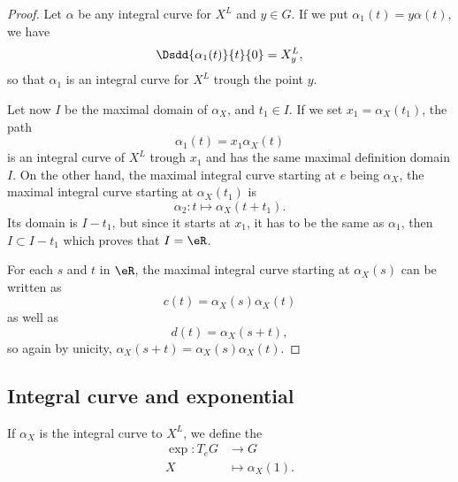 \begin{proof}
    Let \( \alpha\) be any integral curve for \( X^L\) and \( y\in G\). If we put \( \alpha_1(t)=y\alpha(t)\), we have
    \begin{equation}
        \Dsdd{ \alpha_1(t) }{t}{0}=X^L_y,
    \end{equation}
    so that \( \alpha_1\) is an integral curve for \( X^L\) trough the point \( y\). 

    Let now \( I\) be the maximal domain of \( \alpha_X\), and \( t_1\in I\). If we set \( x_1=\alpha_X(t_1)\), the path
    \begin{equation}
         \alpha_1(t)=x_1\alpha_X(t)
    \end{equation}
    is an integral curve of \( X^L\) trough \( x_1\) and has the same maximal definition domain \( I\). On the other hand, the maximal integral curve starting at \( e\) being \( \alpha_X\), the maximal integral curve starting at \( \alpha_X(t_1)\) is
    \begin{equation}
        \alpha_2\colon t\mapsto \alpha_X(t+t_1).
    \end{equation}
    Its domain is \( I-t_1\), but since it starts at \( x_1\), it has to be the same as \( \alpha_1\), then \( I\subset I-t_1\) which proves that \( I=\eR\).

    For each \( s\) and \( t\) in \( \eR\), the maximal integral curve starting at \( \alpha_X(s)\) can be written as
    \begin{equation}
        c(t)=\alpha_X(s)\alpha_X(t)
    \end{equation}
    as well as
    \begin{equation}
        d(t)=\alpha_X(s+t),
    \end{equation}
    so again by unicity, \( \alpha_X(s+t)=\alpha_X(s)\alpha_X(t)\).
\end{proof}


\subsection{Integral curve and exponential}

\begin{definition}
    If \( \alpha_X\) is the integral curve to \( X^L\), we define the 
    \begin{equation}        \label{EqdefExpoLieTgFGp}
        \begin{aligned}
            \exp\colon T_eG&\to G \\
            X&\mapsto \alpha_X(1). 
        \end{aligned}
    \end{equation}
\end{definition}

